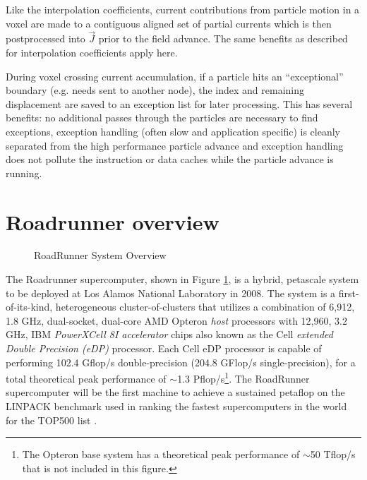 \documentclass[10pt]{article}
\newcommand{\vecJ}{\vec{J}}
\begin{document}

Like the interpolation coefficients, current contributions from
particle motion in a voxel are made to a contiguous aligned set of
partial currents which is then postprocessed into $\vecJ$ prior to the
field advance.  The same benefits as described for interpolation
coefficients apply here.

During voxel crossing current accumulation, if a particle hits an
``exceptional'' boundary (e.g. needs sent to another node), the index
and remaining displacement are saved to an exception list for later
processing.  This has several benefits: no additional passes through
the particles are necessary to find exceptions, exception handling
(often slow and application specific) is cleanly separated from the
high performance particle advance and exception handling does not
pollute the instruction or data caches while the particle advance is
running.

\section{Roadrunner overview}

\begin{figure}
    \begin{center}
    \caption{RoadRunner System Overview}
    \label{fig:system}
    \end{center}
\end{figure}

The Roadrunner supercomputer, shown in Figure \ref{fig:system}, is a
hybrid, petascale system to be deployed at Los Alamos National
Laboratory in 2008.  The system is a first-of-its-kind, heterogeneous
cluster-of-clusters that utilizes a combination of 6,912, 1.8 GHz,
dual-socket, dual-core AMD Opteron \emph{host} processors with 12,960,
3.2 GHz, IBM \emph{PowerXCell 8I accelerator} chips also known as the
Cell \emph{extended Double Precision (eDP)} processor.  Each Cell eDP
processor is capable of performing 102.4 Gflop/s double-precision
(204.8 GFlop/s single-precision), for a total theoretical peak
performance of $\sim$1.3 Pflop/s\footnote{The Opteron base system has
a theoretical peak performance of $\sim$50 Tflop/s that is not
included in this figure.}.  The RoadRunner supercomputer will be the
first machine to achieve a sustained petaflop on the LINPACK benchmark
used in ranking the fastest supercomputers in the world for the TOP500
list \cite{top500}.
\end{document}

